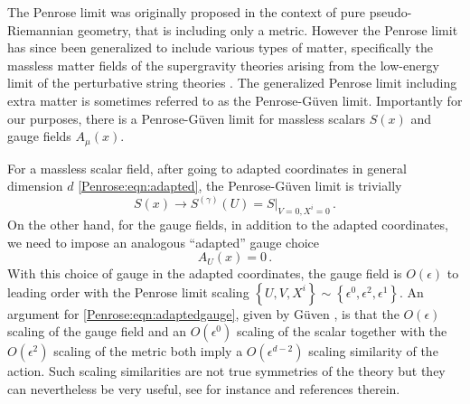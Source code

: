The Penrose limit was originally proposed in the context of pure pseudo-Riemannian geometry, that is including only a metric. However the Penrose limit has since been generalized to include various types of matter, specifically the massless matter fields of the supergravity theories arising from the low-energy limit of the perturbative string theories  \cite{Gueven:2000ru}.  The generalized Penrose limit including extra matter is sometimes referred to as the Penrose-G\"uven limit. Importantly for our purposes, there is a Penrose-G\"uven limit for massless scalars $S(x)$ and gauge fields $A_{\mu}(x)$. 

For a massless scalar field, after going to adapted coordinates in general dimension $d$ \eqref{Penrose:eqn:adapted}, the Penrose-G\"uven limit is trivially 
\begin{equation}
S(x) \to S^{(\gamma)}\left(U\right) = S|_{V=0, X^i=0} \, .
\end{equation}
On the other hand, for the gauge fields, in addition to the adapted coordinates, we need to impose an analogous ``adapted'' gauge choice \cite{Gueven:2000ru}
\begin{equation}\label{Penrose:eqn:adaptedgauge}
A_{U}(x) = 0 \, .
\end{equation}
With this choice of gauge in the adapted coordinates, the gauge field is $O(\epsilon)$ to leading order with the Penrose limit scaling $\left\lbrace U, V, X^i \right\rbrace \sim \left\lbrace \epsilon^0, \epsilon^2, \epsilon^1 \right\rbrace$. An argument for \eqref{Penrose:eqn:adaptedgauge}, given by G\"uven \cite{Gueven:2000ru}, is that the $O(\epsilon)$ scaling of the gauge field and an $O(\epsilon^0)$ scaling of the scalar together with the $O(\epsilon^2)$ scaling of the metric both imply a $O(\epsilon^{d-2})$ scaling similarity of the action. Such scaling similarities are not true symmetries of the theory but they can nevertheless be very useful, see for instance \cite{Biggs:2023sqw} and references therein.

